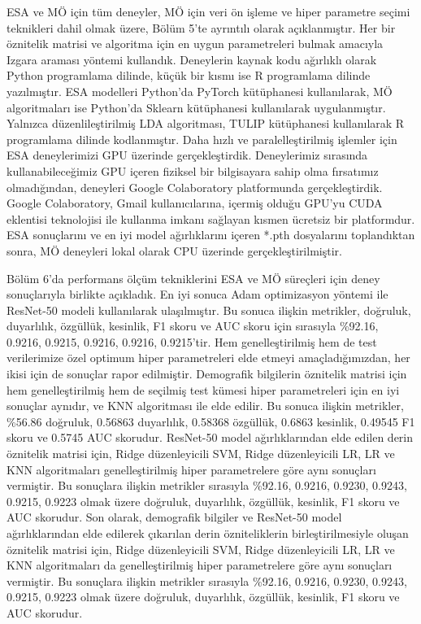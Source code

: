 ESA ve MÖ için tüm deneyler, MÖ için veri ön işleme ve hiper parametre seçimi teknikleri dahil olmak üzere, Bölüm 5'te ayrıntılı olarak açıklanmıştır. Her bir öznitelik matrisi ve algoritma için en uygun parametreleri bulmak amacıyla Izgara araması yöntemi kullandık. Deneylerin kaynak kodu ağırlıklı olarak Python programlama dilinde, küçük bir kısmı ise R programlama dilinde yazılmıştır. ESA modelleri Python'da PyTorch kütüphanesi kullanılarak, MÖ algoritmaları ise Python'da Sklearn kütüphanesi kullanılarak uygulanmıştır. Yalnızca düzenlileştirilmiş LDA algoritması, TULIP kütüphanesi kullanılarak R programlama dilinde kodlanmıştır. Daha hızlı ve paralelleştirilmiş işlemler için ESA deneylerimizi GPU üzerinde gerçekleştirdik. Deneylerimiz sırasında kullanabileceğimiz GPU içeren fiziksel bir bilgisayara sahip olma fırsatımız olmadığından, deneyleri Google Colaboratory platformunda gerçekleştirdik. Google Colaboratory, Gmail kullanıcılarına, içermiş olduğu GPU'yu CUDA eklentisi teknolojisi ile kullanma imkanı sağlayan kısmen ücretsiz bir platformdur. ESA sonuçlarını ve en iyi model ağırlıklarını içeren *.pth dosyalarını toplandıktan sonra, MÖ deneyleri lokal olarak CPU üzerinde gerçekleştirilmiştir.

Bölüm 6'da performans ölçüm tekniklerini ESA ve MÖ süreçleri için deney sonuçlarıyla birlikte açıkladık. En iyi sonuca Adam optimizasyon yöntemi ile ResNet-50 modeli kullanılarak ulaşılmıştır. Bu sonuca ilişkin metrikler, doğruluk, duyarlılık, özgüllük, kesinlik, F1 skoru ve AUC skoru için sırasıyla \%92.16, 0.9216, 0.9215, 0.9216, 0.9216, 0.9215'tir. Hem genelleştirilmiş hem de test verilerimize özel optimum hiper parametreleri elde etmeyi amaçladığımızdan, her ikisi için de sonuçlar rapor edilmiştir. Demografik bilgilerin öznitelik matrisi için hem genelleştirilmiş hem de seçilmiş test kümesi hiper parametreleri için en iyi sonuçlar aynıdır, ve KNN algoritması ile elde edilir. Bu sonuca ilişkin metrikler, \%56.86 doğruluk, 0.56863 duyarlılık, 0.58368 özgüllük, 0.6863 kesinlik, 0.49545 F1 skoru ve 0.5745 AUC skorudur. ResNet-50 model ağırlıklarından elde edilen derin öznitelik matrisi için, Ridge düzenleyicili SVM, Ridge düzenleyicili LR, LR ve KNN algoritmaları genelleştirilmiş hiper parametrelere göre aynı sonuçları vermiştir. Bu sonuçlara ilişkin metrikler sırasıyla \%92.16, 0.9216, 0.9230, 0.9243, 0.9215, 0.9223 olmak üzere doğruluk, duyarlılık, özgüllük, kesinlik, F1 skoru ve AUC skorudur. Son olarak, demografik bilgiler ve ResNet-50 model ağırlıklarından elde edilerek çıkarılan derin özniteliklerin birleştirilmesiyle oluşan öznitelik matrisi için, Ridge düzenleyicili SVM, Ridge düzenleyicili LR, LR ve KNN algoritmaları da genelleştirilmiş hiper parametrelere göre aynı sonuçları vermiştir. Bu sonuçlara ilişkin metrikler sırasıyla \%92.16, 0.9216, 0.9230, 0.9243, 0.9215, 0.9223 olmak üzere doğruluk, duyarlılık, özgüllük, kesinlik, F1 skoru ve AUC skorudur.

